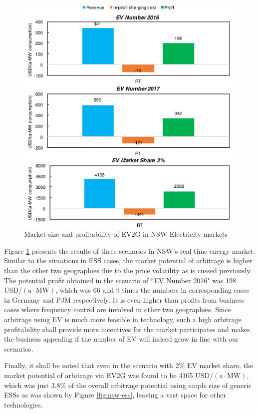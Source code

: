 \begin{figure}[h!]
	\centering
	\includegraphics[width=0.95\linewidth]{Figures/NSW_EV_profit}
	\caption{Market size and profitability of EV2G in NSW Electricity markets}
	\label{fig:NSW_EV}
\end{figure}

Figure \ref{fig:NSW_EV} presents the results of three scenarios in NSW's real-time energy market. Similar to the situations in ESS cases, the market potential of arbitrage is higher than the other two geographies due to the price volatility as is cussed previously. The potential profit obtained in the scenario of ``EV Number 2016" was \num{198} USD/$(\text{a} \cdot \text{MW})$, which was 66 and 9 times the numbers in corresponding cases in Germany and PJM respectively. It is even higher than profits from business cases where frequency control are involved in other two geographies. Since arbitrage using EV is much more feasible in technology, such a high arbitrage profitability shall provide more incentives for the market participates and makes the business appealing if the number of EV will indeed grow in line with our scenarios.

Finally, it shall be noted that even in the scenario with 2\% EV market share, the market potential of arbitrage via EV2G was found to be \num{4105} USD/$(\text{a} \cdot \text{MW})$, which was just 3.8\% of the overall arbitrage potential using ample size of generic ESSs as was shown by Figure \ref{fig:nsw-ess}, leaving a vast space for other technologies.

